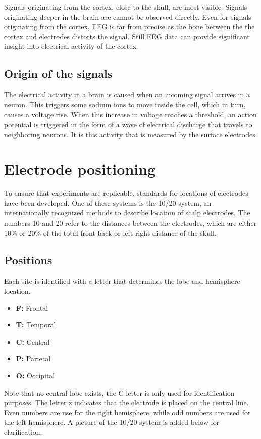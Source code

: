\npar

Signals originating from the cortex, close to the skull, are most visible. Signals originating deeper in the brain are cannot be observed directly. Even for signals originating from the cortex, EEG is far from precise as the bone between the the cortex and electrodes distorts the signal. Still EEG data can provide significant insight into electrical activity of the cortex.

\subsection{Origin of the signals}

The electrical activity in a brain is caused when an incoming signal arrives in a neuron. This triggers some sodium ions to move inside the cell, which in turn, causes a voltage rise\cite{ExtendedPaper}. When this increase in voltage reaches a threshold, an action potential is triggered in the form of a wave of electrical discharge that travels to neighboring neurons. It is this activity that is measured by the surface electrodes.

\section{Electrode positioning}
To ensure that experiments are replicable, standards for locations of electrodes have been developed. One of these systems is the 10/20 system, an internationally recognized methods to describe location of scalp electrodes\cite{TenTwentyManual}. The numbers 10 and 20 refer to the distances between the electrodes, which are either 10\% or 20\% of the total front-back or left-right distance of the skull.

\subsection{Positions}
Each site is identified with a letter that determines the lobe and hemisphere location.
\begin{itemize}
\item \textbf{F:} Frontal
\item \textbf{T:} Temporal
\item \textbf{C:} Central
\item \textbf{P:} Parietal
\item \textbf{O:} Occipital
\end{itemize}
Note that no central lobe exists, the C letter is only used for identification purposes. The letter z indicates that the electrode is placed on the central line. Even numbers are use for the right hemisphere, while odd numbers are used for the left hemisphere. A picture of the 10/20 system is added below for clarification.

